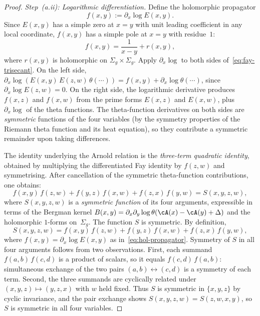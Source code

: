 \begin{proof}
\medskip
\emph{Step~(a.ii): Logarithmic differentiation.}
Define the holomorphic propagator
\begin{equation}\label{eq:hol-propagator}
 f(x,y) := \partial_x \log E(x,y).
\end{equation}
Since $E(x,y)$ has a simple zero at $x = y$ with unit
leading coefficient in any local coordinate, $f(x,y)$ has
a simple pole at $x = y$ with residue~$1$:
\[
 f(x,y) = \frac{1}{x - y} + r(x,y),
\]
where $r(x,y)$ is holomorphic on $\Sigma_g \times \Sigma_g$.
Apply $\partial_x \log$ to both sides
of~\eqref{eq:fay-trisecant}. On the left side,
$\partial_x \log(E(x,y)\, E(z,w)\, \theta(\cdots))
= f(x,y) + \partial_x \log \theta(\cdots)$,
since $\partial_x \log E(z,w) = 0$.
On the right side, the logarithmic derivative
produces $f(x,z)$ and $f(x,w)$ from the prime forms
$E(x,z)$ and $E(x,w)$, plus $\partial_x \log$ of the
theta functions. The theta-function derivatives on both
sides are \emph{symmetric} functions of the four variables
(by the symmetry properties of the Riemann theta function
and its heat equation), so they contribute a symmetric
remainder upon taking differences.

The identity underlying the Arnold relation is the
\emph{three-term quadratic identity}, obtained by
multiplying the differentiated Fay identity by $f(z,w)$
and symmetrising. After cancellation of the symmetric
theta-function contributions, one obtains:
\begin{equation}\label{eq:fay-quadratic}
 f(x,y)\, f(z,w) + f(y,z)\, f(x,w) + f(z,x)\, f(y,w)
 = S(x,y,z,w),
\end{equation}
where $S(x,y,z,w)$ is a \emph{symmetric function} of its
four arguments, expressible in terms of the Bergman kernel
$B(x,y) = \partial_x \partial_y \log \theta(\cA(x) - \cA(y)
+ \Delta)$ and the holomorphic $1$-forms on~$\Sigma_g$.
The function $S$ is symmetric. By definition,
\begin{equation}\label{eq:fay-S-explicit}
 S(x,y,z,w)
 = f(x,y)\,f(z,w)
 + f(y,z)\,f(x,w)
 + f(z,x)\,f(y,w),
\end{equation}
where $f(x,y) = \partial_x \log E(x,y)$ as
in~\eqref{eq:hol-propagator}. Symmetry of $S$ in all four
arguments follows from two observations. First, each summand
$f(a,b)\,f(c,d)$ is a product of scalars, so it equals
$f(c,d)\,f(a,b)$: simultaneous exchange of the two pairs
$(a,b) \leftrightarrow (c,d)$ is a symmetry of each term.
Second, the three summands are cyclically related under
$(x,y,z) \mapsto (y,z,x)$ with $w$ held fixed. Thus $S$ is
symmetric in $\{x,y,z\}$ by cyclic invariance, and the pair
exchange shows $S(x,y,z,w) = S(z,w,x,y)$, so $S$ is symmetric
in all four variables.


\end{proof}
